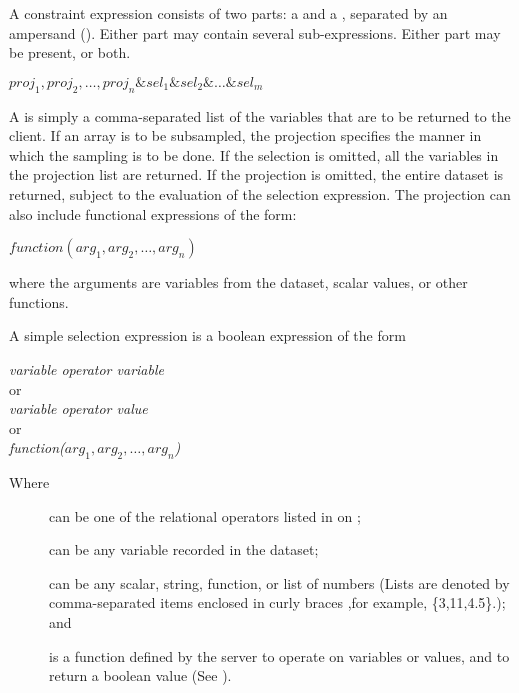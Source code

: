 A constraint expression consists of two parts: a 
 and a ,
 separated by an ampersand
(\lit{\&}).  Either part may contain several sub-expressions.  Either
part may be present, or both.

\begin{center}
  $proj_{1},proj_{2},\ldots,proj_{n}\&sel_{1}\&sel_{2}\&\ldots\&sel_{m}$
\end{center}

A  is simply a comma-separated list of the variables
that are to be returned to the client. If an array is to be
subsampled, the projection specifies the manner in which the sampling
is to be done.  If the selection is omitted, all the variables in the
projection list are returned. If the projection is omitted, the entire
dataset is returned, subject to the evaluation of the selection
expression.  The projection can also include functional expressions of
the form:

\begin{center}
  $function(arg_{1},arg_{2},\ldots,arg_{n})$
\end{center}

\noindent
where the arguments are variables from the dataset, scalar values, or
other functions.

A simple selection expression is a boolean expression of the form 

\begin{center}
{\em variable operator variable}\\
or\\ 
{\em variable operator value}\\
or\\
{\em function($arg_{1},arg_{2},\ldots,arg_{n}$)}\\
\end{center}

Where 

\begin{description}
\item[] can be one of the relational operators listed in
   on
  ;
\item[] can be any variable recorded in the dataset;
\item[] can be any scalar, string, function, or list of
  numbers (Lists are denoted by comma-separated items enclosed in
  curly braces ,for example, \{3,11,4.5\}.); and
\item[] is a function defined by the server to operate
  on variables or values, and to return a boolean value (See
  ). 
\end{description}

